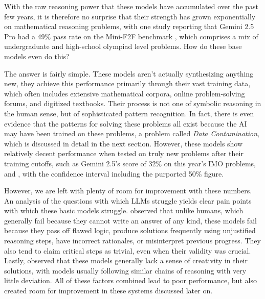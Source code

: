 \documentclass[12pt, letterpaper]{article}
\begin{document}
With the raw reasoning power that these models have accumulated over the past few years, it is therefore no surprise that their strength has grown exponentially on mathematical reasoning problems, with one study reporting  that Gemini 2.5 Pro had a 49\% pass rate \citep{zhou2025solvingformalmathproblems}on the Mini-F2F benchmark \citet{zheng2022minif2fcrosssystembenchmarkformal}, which comprises a mix of undergraduate and high-school olympiad level problems. How do these base models even do this? 

The answer is fairly simple. These models aren't actually synthesizing anything new, they achieve this performance primarily through their vast training data, which often includes extensive mathematical corpora, online problem-solving forums, and digitized textbooks. Their process is not one of symbolic reasoning in the human sense, but of sophisticated pattern recognition. In fact, there is even evidence that the patterns for solving these problems all exist because the AI may have been trained on these problems, a problem called \textit{Data Contamination}, which is discussed in detail in the next section. However, these models show relatively decent performance when tested on truly new problems after their training cutoffs, such as Gemini 2.5's score of 32\% on this year's IMO problems, and \citet{balunovic2025matharena}, with the confidence interval including the purported 50\% figure.

However, we are left with plenty of room for improvement with these numbers. An analysis of the questions with which LLMs struggle yields clear pain points with which these basic models struggle. \citet{petrov2025proofbluffevaluatingllms} observed that unlike humans, which generally fail because they cannot write an answer of any kind, these models fail because they pass off flawed logic, produce solutions frequently using unjustified reasoning
steps, have incorrect rationales, or misinterpret previous progress. They also tend to claim critical steps as trivial, even when their validity was crucial. Lastly, \citep{petrov2025proofbluffevaluatingllms} observed that these models generally lack a sense of creativity in their solutions, with models usually following similar chains of reasoning with very little deviation. All of these factors combined lead to poor performance, but also created room for improvement in these systems discussed later on.


\end{document}
